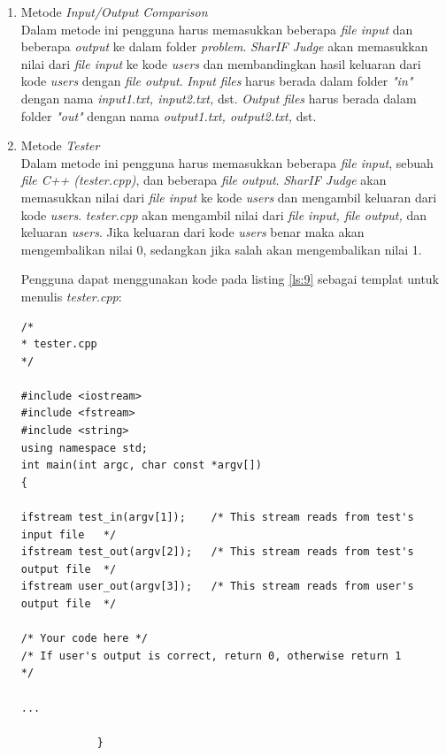 \documentclass[a4paper,twoside]{article}
\begin{document}
\begin{enumerate}
		\begin{enumerate}
			\item Metode \textit{Input/Output Comparison} \\
			Dalam metode ini pengguna harus memasukkan beberapa \textit{file input} dan beberapa \textit{output} ke dalam folder \textit{problem}. \textit{SharIF Judge} akan memasukkan nilai dari \textit{file input} ke kode \textit{users} dan membandingkan hasil keluaran dari kode \textit{users} dengan \textit{file output}. \textit{Input files} harus berada dalam folder \textit{"in"} dengan nama \textit{input1.txt, input2.txt,} dst. \textit{Output files} harus berada dalam folder \textit{"out"} dengan nama \textit{output1.txt, output2.txt,} dst.
			
			\item Metode \textit{Tester} \\
			Dalam metode ini pengguna harus memasukkan beberapa \textit{file input}, sebuah \textit{file C++ (tester.cpp)}, dan beberapa \textit{file output}. \textit{SharIF Judge} akan memasukkan nilai dari \textit{file input} ke kode \textit{users} dan mengambil keluaran dari kode \textit{users}. \textit{tester.cpp} akan mengambil nilai dari \textit{file input, file output,} dan keluaran \textit{users}. Jika keluaran dari kode \textit{users} benar maka akan mengembalikan nilai 0, sedangkan jika salah akan mengembalikan nilai 1.
			
			Pengguna dapat menggunakan kode pada listing \ref{ls:9} sebagai templat untuk menulis \textit{tester.cpp}:
			\begin{lstlisting}[basicstyle=\ttfamily, frame=single,
			columns=fullflexible, keepspaces=true, breaklines=true, label=ls:9, caption=Contoh kode \textit{tester.cpp}]
/*
* tester.cpp
*/

#include <iostream>
#include <fstream>
#include <string>
using namespace std;
int main(int argc, char const *argv[])
{

ifstream test_in(argv[1]);    /* This stream reads from test's input file   */
ifstream test_out(argv[2]);   /* This stream reads from test's output file  */
ifstream user_out(argv[3]);   /* This stream reads from user's output file  */

/* Your code here */
/* If user's output is correct, return 0, otherwise return 1       */

...

			}
			\end{lstlisting}
		\end{enumerate}
		

\end{enumerate}
\end{document}
